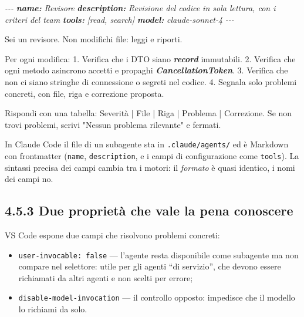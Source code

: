 \documentclass[
  italian,
  10pt,
]{book}
\newenvironment{Shaded}{\begin{snugshade}}{\end{snugshade}}
\newcommand{\AnnotationTok}[1]{\textcolor[rgb]{0.56,0.35,0.01}{\textbf{\textit{#1}}}}
\newcommand{\CommentTok}[1]{\textcolor[rgb]{0.56,0.35,0.01}{\textit{#1}}}
\newcommand{\InformationTok}[1]{\textcolor[rgb]{0.56,0.35,0.01}{\textbf{\textit{#1}}}}
\newcommand{\NormalTok}[1]{#1}
\newcommand{\SpecialStringTok}[1]{\textcolor[rgb]{0.31,0.60,0.02}{#1}}
\providecommand{\tightlist}{%
  \setlength{\itemsep}{0pt}\setlength{\parskip}{0pt}}
\begin{document}
\begin{Shaded}
\begin{Highlighting}[]
\CommentTok{{-}{-}{-}}
\AnnotationTok{name:}\CommentTok{ Revisore}
\AnnotationTok{description:}\CommentTok{ Revisione del codice in sola lettura, con i criteri del team}
\AnnotationTok{tools:}\CommentTok{ [\textquotesingle{}read\textquotesingle{}, \textquotesingle{}search\textquotesingle{}]}
\AnnotationTok{model:}\CommentTok{ claude{-}sonnet{-}4}
\CommentTok{{-}{-}{-}}

\NormalTok{Sei un revisore. Non modifichi file: leggi e riporti.}

\NormalTok{Per ogni modifica:}
\SpecialStringTok{1. }\NormalTok{Verifica che i DTO siano }\InformationTok{\textasciigrave{}record\textasciigrave{}}\NormalTok{ immutabili.}
\SpecialStringTok{2. }\NormalTok{Verifica che ogni metodo asincrono accetti e propaghi }\InformationTok{\textasciigrave{}CancellationToken\textasciigrave{}}\NormalTok{.}
\SpecialStringTok{3. }\NormalTok{Verifica che non ci siano stringhe di connessione o segreti nel codice.}
\SpecialStringTok{4. }\NormalTok{Segnala solo problemi concreti, con file, riga e correzione proposta.}

\NormalTok{Rispondi con una tabella: Severità | File | Riga | Problema | Correzione.}
\NormalTok{Se non trovi problemi, scrivi "Nessun problema rilevante" e fermati.}
\end{Highlighting}
\end{Shaded}

In Claude Code il file di un subagente sta in \texttt{.claude/agents/}
ed è Markdown con frontmatter (\texttt{name}, \texttt{description}, e i
campi di configurazione come \texttt{tools}). La sintassi precisa dei
campi cambia tra i motori: il \emph{formato} è quasi identico, i nomi
dei campi no.

\subsection{4.5.3 Due proprietà che vale la pena
conoscere}\label{due-proprietuxe0-che-vale-la-pena-conoscere}

VS Code espone due campi che risolvono problemi concreti:

\begin{itemize}
\tightlist
\item
  \texttt{user-invocable:\ false} --- l'agente resta disponibile come
  subagente ma non compare nel selettore: utile per gli agenti ``di
  servizio'', che devono essere richiamati da altri agenti e non scelti
  per errore;
\item
  \texttt{disable-model-invocation} --- il controllo opposto: impedisce
  che il modello lo richiami da solo.
\end{itemize}
\end{document}
